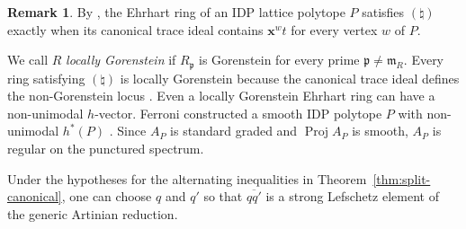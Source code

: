 \documentclass[a4paper,11pt]{amsart}
\newcommand{\m}{\mathfrak{m}}
\newcommand{\natur}{\natural}
\theoremstyle{definition}
\newtheorem{remark}[theorem]{Remark}
\begin{document}
\begin{remark}
By \cite[Proposition~4.1]{M26}, the Ehrhart ring of an IDP lattice polytope $P$ satisfies $(\natur)$ exactly when its canonical trace ideal contains $\mathbf{x}^w t$ for every vertex $w$ of $P$.

We call $R$ \emph{locally Gorenstein} if $R_{\mathfrak p}$ is Gorenstein for every prime $\mathfrak p\ne\m_R$. Every ring satisfying $(\natur)$ is locally Gorenstein because the canonical trace ideal defines the non-Gorenstein locus \cite[Lemma~2.1]{HHS19}. Even a locally Gorenstein Ehrhart ring can have a non-unimodal $h$-vector. Ferroni constructed a smooth IDP polytope $P$ with non-unimodal $h^*(P)$ \cite[Theorem~4.1]{F26}. Since $A_P$ is standard graded and $\operatorname{Proj} A_P$ is smooth, $A_P$ is regular on the punctured spectrum.
\end{remark}

Under the hypotheses for the alternating inequalities in Theorem~\ref{thm:split-canonical}, one can choose $q$ and $q'$ so that $\overline{qq'}$ is a strong Lefschetz element of the generic Artinian reduction.
\end{document}
